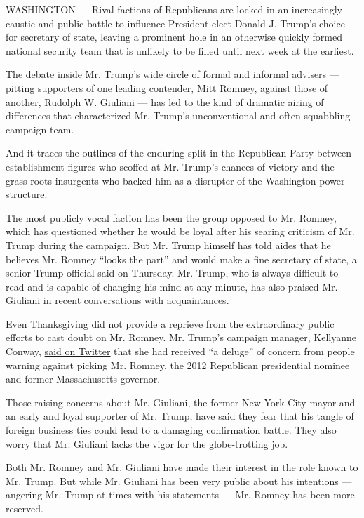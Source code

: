 WASHINGTON --- Rival factions of Republicans are locked in an
increasingly caustic and public battle to influence President-elect
Donald J. Trump's choice for secretary of state, leaving a prominent
hole in an otherwise quickly formed national security team that is
unlikely to be filled until next week at the earliest.

The debate inside Mr. Trump's wide circle of formal and informal
advisers --- pitting supporters of one leading contender, Mitt Romney,
against those of another, Rudolph W. Giuliani --- has led to the kind of
dramatic airing of differences that characterized Mr. Trump's
unconventional and often squabbling campaign team.

And it traces the outlines of the enduring split in the Republican Party
between establishment figures who scoffed at Mr. Trump's chances of
victory and the grass-roots insurgents who backed him as a disrupter of
the Washington power structure.

The most publicly vocal faction has been the group opposed to Mr.
Romney, which has questioned whether he would be loyal after his searing
criticism of Mr. Trump during the campaign. But Mr. Trump himself has
told aides that he believes Mr. Romney ``looks the part'' and would make
a fine secretary of state, a senior Trump official said on Thursday. Mr.
Trump, who is always difficult to read and is capable of changing his
mind at any minute, has also praised Mr. Giuliani in recent
conversations with acquaintances.

Even Thanksgiving did not provide a reprieve from the extraordinary
public efforts to cast doubt on Mr. Romney. Mr. Trump's campaign
manager, Kellyanne Conway,
\href{https://twitter.com/KellyannePolls/status/801787470337740801}{said
on Twitter} that she had received ``a deluge'' of concern from people
warning against picking Mr. Romney, the 2012 Republican presidential
nominee and former Massachusetts governor.

Those raising concerns about Mr. Giuliani, the former New York City
mayor and an early and loyal supporter of Mr. Trump, have said they fear
that his tangle of foreign business ties could lead to a damaging
confirmation battle. They also worry that Mr. Giuliani lacks the vigor
for the globe-trotting job.

Both Mr. Romney and Mr. Giuliani have made their interest in the role
known to Mr. Trump. But while Mr. Giuliani has been very public about
his intentions --- angering Mr. Trump at times with his statements ---
Mr. Romney has been more reserved.

